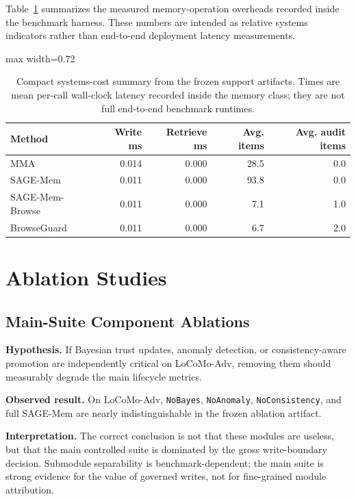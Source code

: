 \documentclass{article}
\begin{document}
Table~\ref{tab:appendix-cost} summarizes the measured memory-operation overheads recorded inside the benchmark harness. These numbers are intended as relative systems indicators rather than end-to-end deployment latency measurements.

\begin{table}[tbp]
\centering
\caption{Compact systems-cost summary from the frozen support artifacts. Times are mean per-call wall-clock latency recorded inside the memory class; they are not full end-to-end benchmark runtimes.}
\label{tab:appendix-cost}
\footnotesize
\setlength{\tabcolsep}{6pt}
\renewcommand{\arraystretch}{0.96}
\begin{adjustbox}{max width=0.72\textwidth}
\begin{tabular}{lrrrr}
\toprule
Method & Write ms & Retrieve ms & Avg. items & Avg. audit items \\
\midrule
MMA & 0.014 & 0.000 & 28.5 & 0.0 \\
SAGE-Mem & 0.011 & 0.000 & 93.8 & 0.0 \\
SAGE-Mem-Browse & 0.011 & 0.000 & 7.1 & 1.0 \\
BrowseGuard & 0.011 & 0.000 & 6.7 & 2.0 \\
\bottomrule
\end{tabular}
\end{adjustbox}
\end{table}

\section{Ablation Studies}

\subsection{Main-Suite Component Ablations}

\noindent\textbf{Hypothesis.} If Bayesian trust updates, anomaly detection, or consistency-aware promotion are independently critical on LoCoMo-Adv, removing them should measurably degrade the main lifecycle metrics.

\noindent\textbf{Observed result.} On LoCoMo-Adv, \texttt{NoBayes}, \texttt{NoAnomaly}, \texttt{NoConsistency}, and full SAGE-Mem are nearly indistinguishable in the frozen ablation artifact.

\noindent\textbf{Interpretation.} The correct conclusion is not that these modules are useless, but that the main controlled suite is dominated by the gross write-boundary decision. Submodule separability is benchmark-dependent; the main suite is strong evidence for the value of governed writes, not for fine-grained module attribution.
\end{document}

